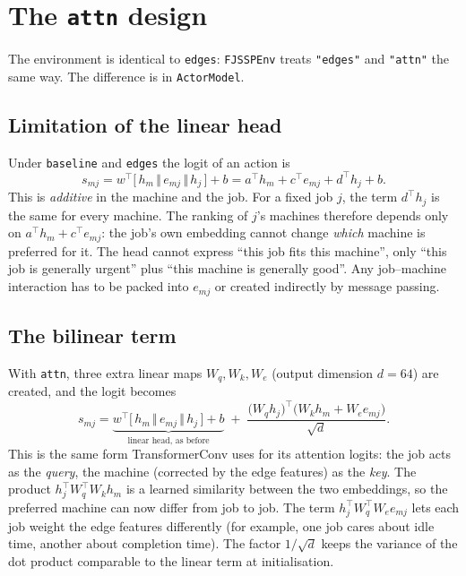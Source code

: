 \documentclass[11pt,a4paper]{article}
\newcommand{\cat}{\,\Vert\,}
\newcommand{\code}[1]{\texttt{#1}}
\theoremstyle{remark}
\begin{document}
\section{The \texttt{attn} design}
\label{sec:attn}

The environment is identical to \code{edges}: \code{FJSSPEnv} treats
\code{"edges"} and \code{"attn"} the same way. The difference is in
\code{ActorModel}.

\subsection{Limitation of the linear head}
Under \code{baseline} and \code{edges} the logit of an action is
\[
  s_{mj} = w^\top\bigl[\,h_m \cat e_{mj} \cat h_j\,\bigr] + b
         = a^\top h_m + c^\top e_{mj} + d^\top h_j + b .
\]
This is \emph{additive} in the machine and the job. For a fixed job $j$, the term
$d^\top h_j$ is the same for every machine. The ranking of $j$'s machines therefore depends
only on $a^\top h_m + c^\top e_{mj}$: the job's own embedding cannot change \emph{which}
machine is preferred for it. The head cannot express ``this job fits this
machine'', only ``this job is generally urgent'' plus ``this machine is generally good''.
Any job--machine interaction has to be packed into $e_{mj}$ or created indirectly
by message passing.

\subsection{The bilinear term}
With \code{attn}, three extra linear maps $W_q, W_k, W_e$ (output dimension $d=64$)
are created, and the logit becomes
\[
  s_{mj} = \underbrace{w^\top\bigl[\,h_m \cat e_{mj} \cat h_j\,\bigr] + b}_{\text{linear head, as before}}
  \;+\;
  \frac{\bigl(W_q h_j\bigr)^{\!\top}\bigl(W_k h_m + W_e e_{mj}\bigr)}{\sqrt{d}} .
\]
This is the same form TransformerConv uses for its attention logits: the job acts as
the \emph{query}, the machine (corrected by the edge features) as the \emph{key}. The
product $h_j^\top W_q^\top W_k h_m$ is a learned similarity between the two embeddings,
so the preferred machine can now differ from job to job. The term
$h_j^\top W_q^\top W_e e_{mj}$ lets each job weight the edge features differently
(for example, one job cares about idle time, another about completion time). The factor
$1/\sqrt{d}$ keeps the variance of the dot product comparable to the linear term at
initialisation.
\end{document}
